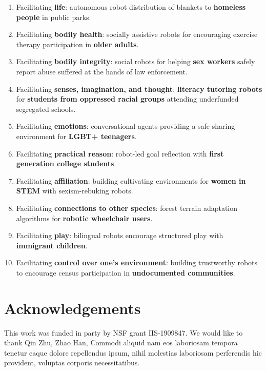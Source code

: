 \documentclass[letterpaper]{article} %
\begin{document}
\begin{enumerate}
\item Facilitating \textbf{life}:  autonomous robot distribution of blankets to \textbf{homeless people} in public parks.
\item Facilitating \textbf{bodily health}: socially assistive robots for encouraging exercise therapy participation in \textbf{older adults}.
\item Facilitating \textbf{bodily integrity}: social robots for helping \textbf{sex workers} safely report abuse suffered at the hands of law enforcement.
\item Facilitating \textbf{senses, imagination, and thought}:  \textbf{literacy tutoring robots} for \textbf{students from oppressed racial groups} attending underfunded segregated schools.
\item Facilitating \textbf{emotions}:  conversational agents providing a safe sharing environment for \textbf{LGBT+ teenagers}.
\item Facilitating \textbf{practical reason}: robot-led goal reflection with \textbf{first generation college students}.
\item Facilitating \textbf{affiliation}: building cultivating environments for \textbf{women in STEM} with sexism-rebuking robots.
\item Facilitating \textbf{connections to other species}: forest terrain adaptation algorithms for \textbf{robotic wheelchair users}.
\item Facilitating \textbf{play}:  bilingual robots encourage structured play with \textbf{immigrant children}.
\item Facilitating \textbf{control over one's environment}: building trustworthy robots to encourage census participation in \textbf{undocumented communities}.
\end{enumerate}

\vspace{-0.77mm}
\section*{Acknowledgements}
This work was funded in party by NSF grant IIS-1909847. We would like to thank Qin Zhu, Zhao Han,  Commodi aliquid nam eos laboriosam tempora tenetur eaque dolore repellendus ipsum, nihil molestias laboriosam perferendis hic provident, voluptas corporis necessitatibus.\clearpage

\end{document}
